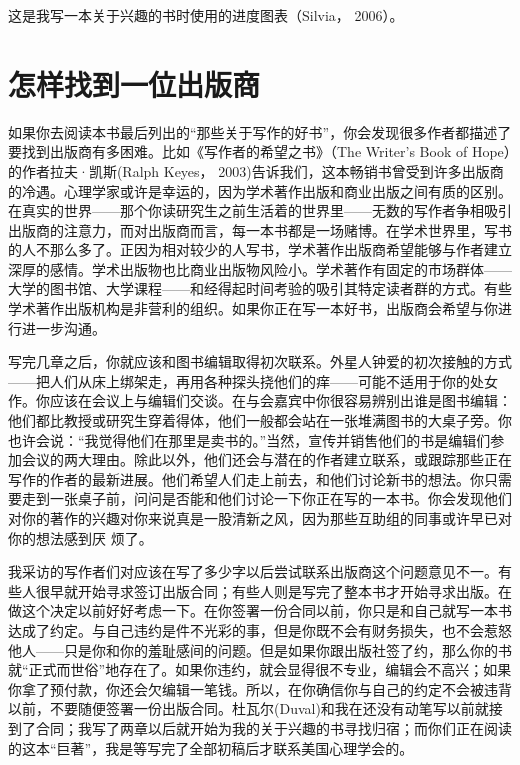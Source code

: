 \begin{remark}
这是我写一本关于兴趣的书时使用的进度图表（Silvia， 2006）。
\end{remark}


\section{怎样找到一位出版商}
如果你去阅读本书最后列出的“那些关于写作的好书”，你会发现很多作者都描述了要找到出版商有多困难。比如《写作者的希望之书》（The Writer's Book of Hope）的作者拉夫·凯斯(Ralph Keyes， 2003)告诉我们，这本畅销书曾受到许多出版商的冷遇。心理学家或许是幸运的，因为学术著作出版和商业出版之间有质的区别。在真实的世界——那个你读研究生之前生活着的世界里——无数的写作者争相吸引出版商的注意力，而对出版商而言，每一本书都是一场赌博。在学术世界里，写书的人不那么多了。正因为相对较少的人写书，学术著作出版商希望能够与作者建立深厚的感情。学术出版物也比商业出版物风险小。学术著作有固定的市场群体——大学的图书馆、大学课程——和经得起时间考验的吸引其特定读者群的方式。有些学术著作出版机构是非营利的组织。如果你正在写一本好书，出版商会希望与你进行进一步沟通。

写完几章之后，你就应该和图书编辑取得初次联系。外星人钟爱的初次接触的方式——把人们从床上绑架走，再用各种探头挠他们的痒——可能不适用于你的处女作。你应该在会议上与编辑们交谈。在与会嘉宾中你很容易辨别出谁是图书编辑：他们都比教授或研究生穿着得体，他们一般都会站在一张堆满图书的大桌子旁。你也许会说：“我觉得他们在那里是卖书的。”当然，宣传并销售他们的书是编辑们参加会议的两大理由。除此以外，他们还会与潜在的作者建立联系，或跟踪那些正在写作的作者的最新进展。他们希望人们走上前去，和他们讨论新书的想法。你只需要走到一张桌子前，问问是否能和他们讨论一下你正在写的一本书。你会发现他们对你的著作的兴趣对你来说真是一股清新之风，因为那些互助组的同事或许早已对你的想法感到厌
烦了。

我采访的写作者们对应该在写了多少字以后尝试联系出版商这个问题意见不一。有些人很早就开始寻求签订出版合同；有些人则是写完了整本书才开始寻求出版。在做这个决定以前好好考虑一下。在你签署一份合同以前，你只是和自己就写一本书达成了约定。与自己违约是件不光彩的事，但是你既不会有财务损失，也不会惹怒他人——只是你和你的羞耻感间的问题。但是如果你跟出版社签了约，那么你的书就“正式而世俗”地存在了。如果你违约，就会显得很不专业，编辑会不高兴；如果你拿了预付款，你还会欠编辑一笔钱。所以，在你确信你与自己的约定不会被违背以前，不要随便签署一份出版合同。杜瓦尔(Duval)和我在还没有动笔写以前就接到了合同；我写了两章以后就开始为我的关于兴趣的书寻找归宿；而你们正在阅读的这本“巨著”，我是等写完了全部初稿后才联系美国心理学会的。

